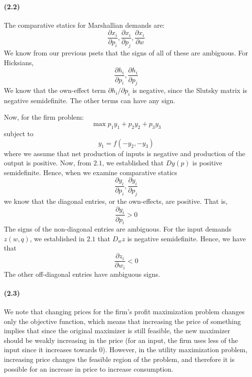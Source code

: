 \documentclass[10pt,letter]{article}
\begin{document}
\paragraph{(2.2)}
The comparative statics for Marshallian demands are:
\[ \frac{\partial x_i}{\partial p_i},\frac{\partial x_i}{\partial p_j},\frac{\partial x_i}{\partial w} \]
We know from our previous psets that the signs of all of these are ambiguous. For Hicksians,
\[ \frac{\partial h_i}{\partial p_i},\frac{\partial h_i}{\partial p_j}\]
We know that the own-effect term $\partial h_i / \partial p_i$ is negative, since the Slutsky matrix is negative semidefinite. The other terms can have any sign.

Now, for the firm problem:
\[ \max p_1 y_1 + p_2 y_2 + p_3 y_3 \]
subject to
\[ y_1 = f(-y_2, -y_3)\]
where we assume that net production of inputs is negative and production of the output is positive. Now, from $2.1$, we established that $Dy(p)$ is positive semidefinite. Hence, when we examine comparative statics
\[ \frac{\partial y_i}{\partial p_i}, \frac{\partial y_i}{\partial p_j} \]
we know that the diagonal entries, or the own-effects, are positive. That is,
\[ \frac{\partial y_i}{\partial p_i} > 0 \]
The signs of the non-diagonal entries are ambiguous. For the input demands $z(w,q)$, we established in $2.1$ that $D_w z$ is negative semidefinite. Hence, we have that
\[ \frac{\partial z_i}{ \partial w_i} < 0 \]
The other off-diagonal entries have ambiguous signs.

\paragraph{(2.3)}
We note that changing prices for the firm's profit maximization problem changes only the objective function, which means that increasing the price of something implies that since the original maximizer is still feasible, the new maximizer should be weakly increasing in the price (for an input, the firm uses less of the input since it increases towards 0). However, in the utility maximization problem, increasing price changes the feasible region of the problem, and therefore it is possible for an increase in price to increase consumption.
\end{document}
